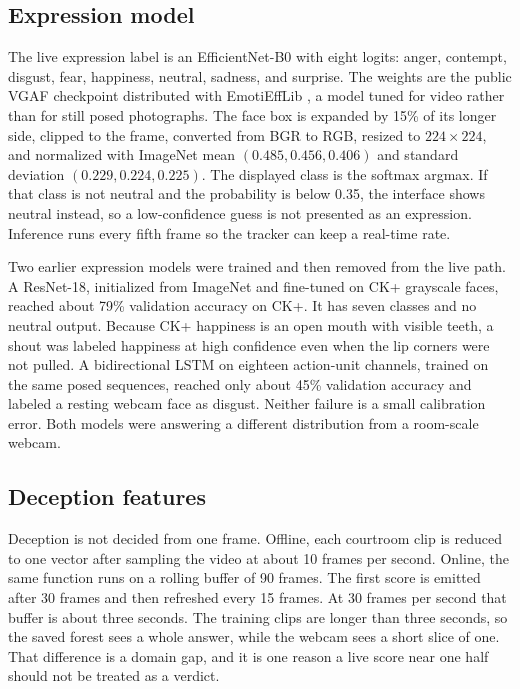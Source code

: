 \documentclass[conference]{IEEEtran}
\begin{document}
\subsection{Expression model}
The live expression label is an EfficientNet-B0 with eight logits: anger, contempt, disgust, fear, happiness, neutral, sadness, and surprise. The weights are the public VGAF checkpoint distributed with EmotiEffLib \cite{savchenko2021hsemotion}, a model tuned for video rather than for still posed photographs. The face box is expanded by 15\% of its longer side, clipped to the frame, converted from BGR to RGB, resized to $224 \times 224$, and normalized with ImageNet mean $(0.485, 0.456, 0.406)$ and standard deviation $(0.229, 0.224, 0.225)$. The displayed class is the softmax argmax. If that class is not neutral and the probability is below 0.35, the interface shows neutral instead, so a low-confidence guess is not presented as an expression. Inference runs every fifth frame so the tracker can keep a real-time rate.

Two earlier expression models were trained and then removed from the live path. A ResNet-18, initialized from ImageNet and fine-tuned on CK+ grayscale faces, reached about 79\% validation accuracy on CK+. It has seven classes and no neutral output. Because CK+ happiness is an open mouth with visible teeth, a shout was labeled happiness at high confidence even when the lip corners were not pulled. A bidirectional LSTM on eighteen action-unit channels, trained on the same posed sequences, reached only about 45\% validation accuracy and labeled a resting webcam face as disgust. Neither failure is a small calibration error. Both models were answering a different distribution from a room-scale webcam.

\subsection{Deception features}
Deception is not decided from one frame. Offline, each courtroom clip is reduced to one vector after sampling the video at about 10 frames per second. Online, the same function runs on a rolling buffer of 90 frames. The first score is emitted after 30 frames and then refreshed every 15 frames. At 30 frames per second that buffer is about three seconds. The training clips are longer than three seconds, so the saved forest sees a whole answer, while the webcam sees a short slice of one. That difference is a domain gap, and it is one reason a live score near one half should not be treated as a verdict.
\end{document}
